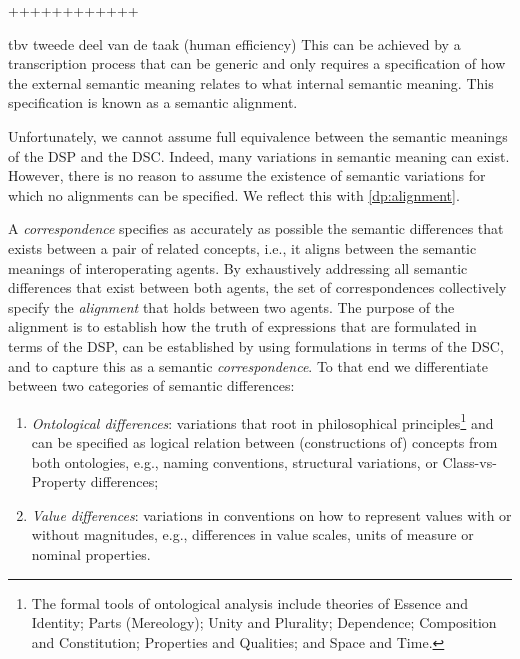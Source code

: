 \documentclass[sort&compress,preprint,authoryear,3p,twocolumn]{elsarticle}
\providecommand{\tightlist}{%
  \setlength{\itemsep}{0pt}\setlength{\parskip}{0pt}}
\begin{document}
++++++++++++

tbv tweede deel van de taak (human efficiency) This can be achieved by a
transcription process that can be generic and only requires a
specification of how the external semantic meaning relates to what
internal semantic meaning. This specification is known as a semantic
alignment.

Unfortunately, we cannot assume full equivalence between the semantic
meanings of the DSP and the DSC. Indeed, many variations in semantic
meaning can exist. However, there is no reason to assume the existence
of semantic variations for which no alignments can be specified. We
reflect this with \cref{dp:alignment}.

A \emph{correspondence} specifies as accurately as possible the semantic
differences that exists between a pair of related concepts, i.e., it
aligns between the semantic meanings of interoperating agents. By
exhaustively addressing all semantic differences that exist between both
agents, the set of correspondences collectively specify the
\emph{alignment} that holds between two agents. The purpose of the
alignment is to establish how the truth of expressions that are
formulated in terms of the DSP, can be established by using formulations
in terms of the DSC, and to capture this as a semantic
\emph{correspondence}. To that end we differentiate between two
categories of semantic differences:

\begin{enumerate}
\def\labelenumi{\arabic{enumi}.}
\tightlist
\item
  \emph{Ontological differences}: variations that root in philosophical
  principles\footnote{The formal tools of ontological analysis include
    theories of Essence and Identity; Parts (Mereology); Unity and
    Plurality; Dependence; Composition and Constitution; Properties and
    Qualities; and Space and Time.} and can be specified as logical
  relation between (constructions of) concepts from both ontologies,
  e.g., naming conventions, structural variations, or Class-vs-Property
  differences;
\item
  \emph{Value differences}: variations in conventions on how to
  represent values with or without magnitudes, e.g., differences in
  value scales, units of measure or nominal properties.
\end{enumerate}
\end{document}
